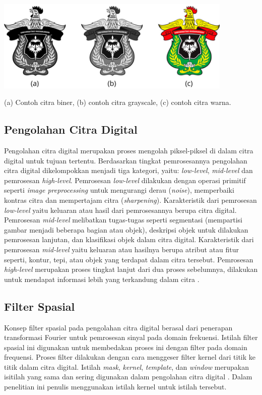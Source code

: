 \begin{afigure}
    \includegraphics[width=0.85\textwidth, center]{images/jenis-jenis-citra.png}
    \caption{(a) Contoh citra biner, (b) contoh citra grayscale, (c) contoh citra warna.}
    \label{fig:jenis-citra}
\end{afigure}


\subsection{Pengolahan Citra Digital}
Pengolahan citra digital merupakan proses mengolah piksel-piksel di dalam citra digital untuk tujuan tertentu. Berdasarkan tingkat pemrosesannya pengolahan citra digital dikelompokkan menjadi tiga kategori, yaitu: \textit{low-level}, \textit{mid-level} dan pemrosesan \textit{high-level}. Pemrosesan \textit{low-level} dilakukan dengan operasi primitif seperti \textit{image preprocessing} untuk mengurangi derau (\textit{noise}), memperbaiki kontras citra dan mempertajam citra (\textit{sharpening}). Karakteristik dari pemrosesan \textit{low-level} yaitu keluaran atau hasil dari pemrosesannya berupa citra digital. Pemrosesan \textit{mid-level} melibatkan tugas-tugas seperti segmentasi (mempartisi gambar menjadi beberapa bagian atau objek), deskripsi objek untuk dilakukan pemrosesan lanjutan, dan klasifikasi objek dalam citra digital. Karakteristik dari pemrosesan \textit{mid-level} yaitu keluaran atau hasilnya berupa atribut atau fitur seperti, kontur, tepi, atau objek yang terdapat dalam citra tersebut. Pemrosesan \textit{high-level} merupakan proses tingkat lanjut dari dua proses sebelumnya, dilakukan untuk mendapat informasi lebih yang terkandung dalam citra .


\subsection{Filter Spasial}
Konsep filter spasial pada pengolahan citra digital berasal dari penerapan transformasi Fourier untuk pemrosesan sinyal pada domain frekuensi. Istilah filter spasial ini digunakan untuk membedakan proses ini dengan filter pada domain frequensi. Proses filter dilakukan dengan cara menggeser filter kernel dari titik ke titik dalam citra digital. Istilah \textit{mask}, \textit{kernel}, \textit{template}, dan \textit{window} merupakan isitilah yang sama dan sering digunakan dalam pengolahan citra digital . Dalam penelitian ini penulis menggunakan istilah kernel untuk istilah tersebut.

